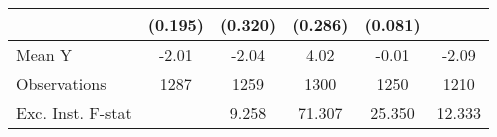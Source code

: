 {\begin{tabular}{l*{5}{c}}
            &     (0.195)         &     (0.320)         &     (0.286)         &     (0.081)         &                     \\
\midrule
Mean Y      &       -2.01         &       -2.04         &        4.02         &       -0.01         &       -2.09         \\
Observations&        1287         &        1259         &        1300         &        1250         &        1210         \\
Exc. Inst. F-stat&                     &       9.258         &      71.307         &      25.350         &      12.333         \\
\bottomrule
\end{tabular}
}
